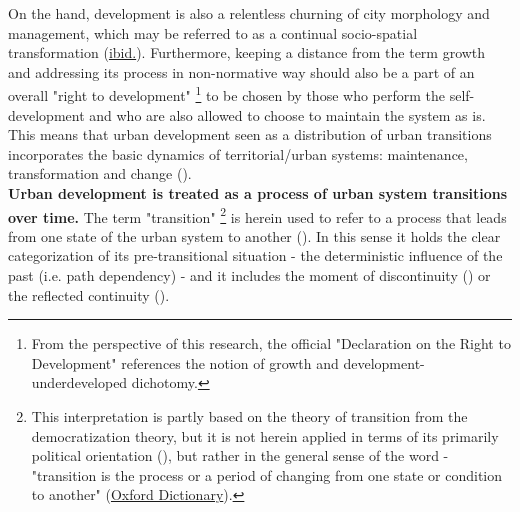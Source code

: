 \documentclass[11pt]{report}
\begin{document}
{{On the hand, development is also a relentless churning of city morphology and management, which may be referred to as a continual socio-spatial transformation  (\href{Brenner}{ibid.}).
Furthermore, keeping a distance from the term growth and addressing its process in non-normative way should also be a part of an overall "right to development"
\footnote{From the perspective of this research, the official \href{UN}{\citealt{united_nations_declaration_1986}} "Declaration on the Right to Development" references the notion of growth and development-underdeveloped dichotomy.}
to be chosen by those who perform the self-development and who are also allowed to choose to maintain the system as is.
This means that urban development seen as a distribution of urban transitions incorporates the basic dynamics of territorial/urban systems: maintenance, transformation and change (\href{Friedmann}{\citealt{friedmann_planning_1987}}).
\\

\textbf{Urban development is treated as a process of urban system transitions over time.}
The term "transition"
\footnote{This interpretation is partly based on the theory of transition from the democratization theory, but it is not herein applied in terms of its primarily political orientation (\href{Offe}{\citealt{Offe_varieties_1997}}), but rather in the general sense of the word - "transition is the process or a period of changing from one state or condition to another" (\href{Oxford}{Oxford Dictionary}).}
is herein used to refer to a process that leads from one state of the urban system to another
(\href{Stark}{\citealt{stark_system_1992}}).
In this sense it holds the clear categorization of its pre-transitional situation - the deterministic influence of the past (i.e. path dependency) - and it includes the moment of discontinuity (\href{Thomas}{\citealt{thomas_thinking_1998}}) or the reflected continuity (\href{Nedovic}{\citealt{nedovic-budic_mornings_2011}}).
\\

}}
\end{document}

